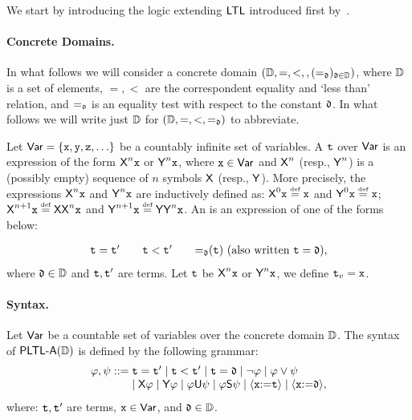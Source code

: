 We start by introducing the logic extending ${\rm\textsf{LTL}}$ introduced first by~\cite{Pnueli77}. 


\paragraph{Concrete Domains.} In what follows we will consider a concrete domain $(\mathbb{D},=,<,,(=_{\mathfrak{d}})_{\mathfrak{d}\in\mathbb{D}})$, where $\mathbb{D}$ is a set of elements, $=,<$ are the correspondent equality and `less than' relation, and $=_{\mathfrak{d}}$ is an equality test with respect to the constant $\mathfrak{d}$.  In what follows we will write just $\mathbb{D}$ for $(\mathbb{D},=,<,=_{\mathfrak{d}})$ to abbreviate.

Let ${\rm \sf Var}=\{\mathtt{x},\mathtt{y},\mathtt{z},\ldots\}$ be a countably infinite set of variables. A  $\mathtt{t}$ over ${\rm \sf Var}$ is an expression of the form ${\operatorname{\sf X}}^n\mathtt{x}$ or ${\operatorname{\sf Y}}^n\mathtt{x}$, where $\mathtt{x}\in{\rm \sf Var}$ and ${\operatorname{\sf X}}^n$ (resp., ${\operatorname{\sf Y}}^n$) is a (possibly empty) sequence of $n$ symbols ${\operatorname{\sf X}}$ (resp., ${\operatorname{\sf Y}}$). 
More precisely, the expressions ${\operatorname{\sf X}}^n\mathtt{x}$ and ${\operatorname{\sf Y}}^n\mathtt{x}$ are inductively defined as: $\Next^0\avar \egdef \avar$ and $\Prev^0\avar \egdef \avar$; $\Next^{n+1}\avar \egdef \Next\Nextn\avar$ and $\Prev^{n+1}\avar \egdef \Prev\Prevn\avar$. 
An  is an expression of one of the forms below:

\[
    \begin{array}{c@{\quad\quad}c@{\quad\quad}c}
        \aterm = \aterm' & \aterm < \aterm' & {=_{\adatum}}(\aterm) \mbox{ (also written $\aterm=\adatum$)},
    \end{array}
\]
where $\mathfrak{d}\in\mathbb{D}$ and $\mathtt{t},\mathtt{t}'$ are terms. Let $\mathtt{t}$ be ${\operatorname{\sf X}}^n\mathtt{x}$ or ${\operatorname{\sf Y}}^n\mathtt{x}$, we define $\mathtt{t}_v=\mathtt{x}$. 

\paragraph{Syntax.} Let ${\rm \sf Var}$ be a countable set of variables over the concrete domain $\mathbb{D}$. The syntax of ${\rm\textsf{PLTL-A}}(\mathbb{D})$ is defined by the following grammar:
\[
    \begin{array}{l@{\;}l}
    \aformula,\aformulabis  ::= & \aterm = \aterm' \mid \aterm < \aterm' \mid \aterm = \adatum \mid \neg\aformula \mid \aformula \vee \aformulabis \\
     &  \mid \Next\aformula \mid \Prev\aformula \mid \aformula \Until \aformulabis \mid \aformula\Since\aformulabis \mid \Assign{\avar}{\aterm} \mid \Assign{\avar}{\adatum},
    \end{array}
\]
where: $\mathtt{t},\mathtt{t}'$ are terms, $\mathtt{x}\in{\rm \sf Var}$, and $\mathfrak{d}\in\mathbb{D}$.  

